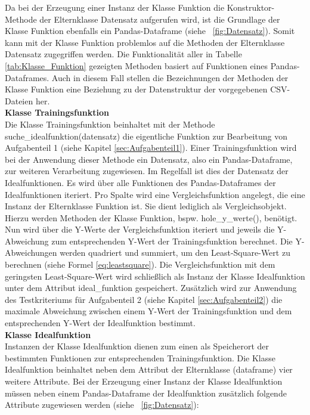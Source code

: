 \documentclass[11pt,a4paper]{scrreprt}
\newcommand{\abbildung}[1]{\figurename\ \ref{#1}}
\begin{document}
Da bei der Erzeugung einer Instanz der Klasse Funktion die Konstruktor-Methode der Elternklasse Datensatz aufgerufen wird, ist die Grundlage der Klasse Funktion ebenfalls ein Pandas-Dataframe (siehe \abbildung{fig:Datensatz}). Somit kann mit der Klasse Funktion  problemlos auf die Methoden der Elternklasse Datensatz zugegriffen werden. Die Funktionalität aller in Tabelle \ref{tab:Klasse_Funktion} gezeigten Methoden basiert auf Funktionen eines Pandas-Dataframes. Auch in diesem Fall stellen die Bezeichnungen der Methoden der Klasse Funktion eine Beziehung zu der Datenstruktur der vorgegebenen CSV-Dateien her. \vspace{6pt}\\ 
\vspace{6pt}\textbf{Klasse Trainingsfunktion}\\
Die Klasse Trainingsfunktion beinhaltet mit der Methode suche\_idealfunktion(datensatz) die eigentliche Funktion zur Bearbeitung von Aufgabenteil 1 (siehe Kapitel \ref{sec:Aufgabenteil1}). Einer Trainingsfunktion wird bei der Anwendung dieser Methode ein Datensatz, also ein Pandas-Dataframe, zur weiteren Verarbeitung zugewiesen. Im Regelfall ist dies der Datensatz der Idealfunktionen. Es wird über alle Funktionen des Pandas-Dataframes der Idealfunktionen iteriert. Pro Spalte wird eine Vergleichsfunktion angelegt, die eine Instanz der Elternklasse Funktion ist. Sie dient lediglich als Vergleichsobjekt. Hierzu werden Methoden der Klasse Funktion, bspw. hole\_y\_werte(), benötigt. Nun wird über die Y-Werte der Vergleichsfunktion iteriert und jeweils die Y-Abweichung zum entsprechenden Y-Wert der Trainingsfunktion berechnet. Die Y-Abweichungen werden quadriert und summiert, um den Least-Square-Wert zu berechnen (siehe Formel \ref{eq:leastsquare}). Die Vergleichsfunktion mit dem geringsten Least-Square-Wert wird schließlich als Instanz der Klasse Idealfunktion unter dem Attribut ideal\_funktion gespeichert. Zusätzlich wird zur Anwendung des Testkriteriums für Aufgabenteil 2 (siehe Kapitel \ref{sec:Aufgabenteil2}) die maximale Abweichung zwischen einem Y-Wert der Trainingsfunktion und dem entsprechenden Y-Wert der Idealfunktion bestimmt.\vspace{6pt}\\ 
%
\vspace{6pt}\textbf{Klasse Idealfunktion}\\
Instanzen der Klasse Idealfunktion dienen zum einen als Speicherort der bestimmten Funktionen zur entsprechenden Trainingsfunktion. Die Klasse Idealfunktion beinhaltet neben dem Attribut der Elternklasse (dataframe) vier weitere Attribute. Bei der Erzeugung einer Instanz der Klasse Idealfunktion müssen neben einem Pandas-Dataframe der Idealfunktion zusätzlich folgende Attribute zugewiesen werden (siehe \abbildung{fig:Datensatz}):
\end{document}
